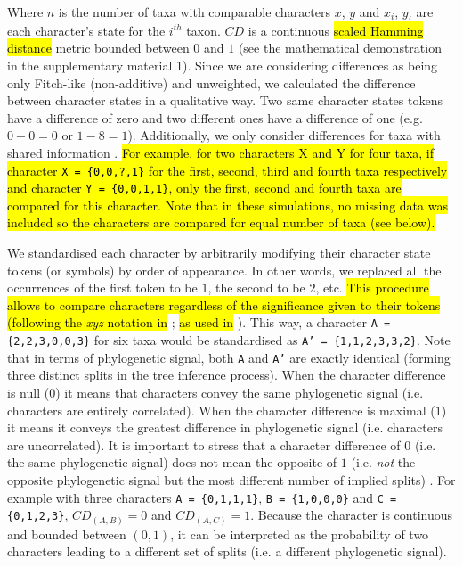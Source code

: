 \documentclass[12pt,letterpaper]{article}
\begin{document}

\noindent Where $n$ is the number of taxa with comparable characters $x$, $y$ and $x_i$, $y_i$ are each character's state for the $i^{th}$ taxon.
$CD$ is a continuous \hl{scaled Hamming distance} metric bounded between $0$ and $1$ (see the mathematical demonstration in the supplementary material 1).
Since we are considering differences as being only Fitch-like (non-additive) and unweighted, we calculated the difference between character states in a qualitative way.
Two same character states tokens have a difference of zero and two different ones have a difference of one (e.g. $0 - 0 = 0$ or $1 - 8 = 1$).
Additionally, we only consider differences for taxa with shared information \citep[i.e. a Gower distance;][]{GowerDist}.
\hl{For example, for two characters X and Y for four taxa, if character \texttt{X = \{0,0,?,1\}} for the first, second, third and fourth taxa respectively and character \texttt{Y = \{0,0,1,1\}}, only the first, second and fourth taxa are compared for this character.
Note that in these simulations, no missing data was included so the characters are compared for equal number of taxa (see below).}

We standardised each character by arbitrarily modifying their character state tokens (or symbols) by order of appearance.
In other words, we replaced all the occurrences of the first token to be $1$, the second to be $2$, etc.
\hl{This procedure allows to compare characters regardless of the significance given to their tokens (following the \textit{xyz} notation in }
\citealt{felsenstein2004inferring}; \hl{as used in} \citealt{Davalos01072014}).
This way, a character \texttt{A = \{2,2,3,0,0,3\}} for six taxa would be standardised as \texttt{A' = \{1,1,2,3,3,2\}}.
Note that in terms of phylogenetic signal, both \texttt{A} and \texttt{A'} are exactly identical (forming three distinct splits in the tree inference process).
When the character difference is null ($0$) it means that characters convey the same phylogenetic signal (i.e. characters are entirely correlated).
When the character difference is maximal ($1$) it means it conveys the greatest difference in phylogenetic signal (i.e. characters are uncorrelated).
It is important to stress that a character difference of $0$ (i.e. the same phylogenetic signal) does not mean the opposite of $1$ (i.e. \textit{not} the opposite phylogenetic signal but the most different number of implied splits) .
For example with three characters \texttt{A = \{0,1,1,1\}}, \texttt{B = \{1,0,0,0\}} and \texttt{C = \{0,1,2,3\}}, $CD_{(A,B)} = 0$ and $CD_{(A,C)} = 1$.
Because the character is continuous and bounded between $(0,1)$, it can be interpreted as the probability of two characters leading to a different set of splits (i.e. a different phylogenetic signal).
\end{document}
